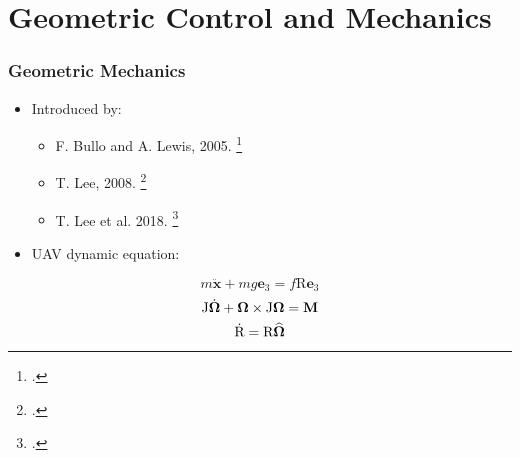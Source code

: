 \section{Geometric Control and Mechanics}

\begin{frame}
	\frametitle{Geometric Mechanics}
	
	\begin{itemize}
		\item Introduced by:
		\begin{itemize}
			\item F. Bullo and A. Lewis, 2005. \footcite{bulloBook}
			\item T. Lee, 2008. \footcite{Taeyoung Lee, Computational geometric mechanics and control of rigid bodies}
			\item T. Lee et al. 2018. \footcite{LeeModel} 
		\end{itemize}
		\item UAV dynamic equation:
	\end{itemize}
	
	\begin{equation}
	m \ddot{\textbf{x}} + m g\textbf{e}_3 = f\text{R}\textbf{e}_3 \label{model1}
	\end{equation}
	\begin{equation}
		\text{J}\dot{\boldsymbol{\Omega}} + \boldsymbol{\Omega} \times \text{J}\boldsymbol{\Omega} = \textbf{M} \label{model2}
	\end{equation}
	\begin{equation}                       
	\dot{\text{R}} = \text{R}\widehat{\boldsymbol{\Omega}} \label{model3}
	\end{equation}
	
\end{frame}